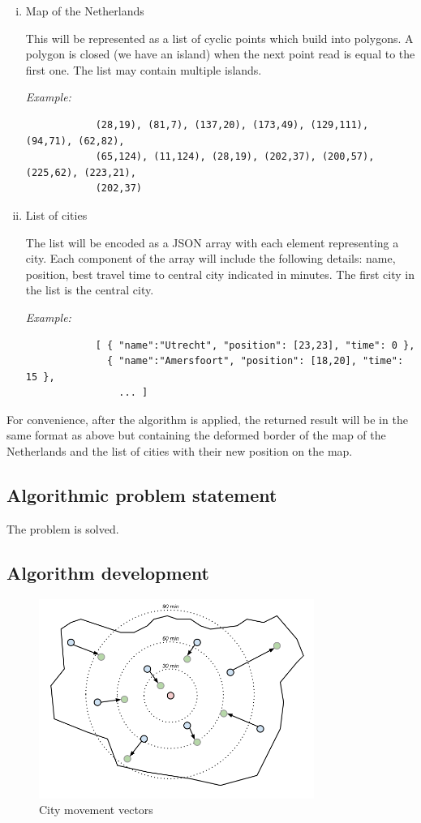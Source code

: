 \documentclass[a4paper,11pt]{article}
\begin{document}
\begin{enumerate}[(i)]
	\item Map of the Netherlands
	
		This will be represented as a list of cyclic points which build into polygons. A polygon is closed (we have an island) when the next point read is equal to the first one. The list may contain multiple islands.
		
		\emph{Example:} 
		\begin{verbatim}
			(28,19), (81,7), (137,20), (173,49), (129,111), (94,71), (62,82),
			(65,124), (11,124), (28,19), (202,37), (200,57), (225,62), (223,21),
			(202,37)
		\end{verbatim}

	\item List of cities
	
		The list will be encoded as a JSON array with each element representing a city. Each component of the array will include the following details: name, position, best travel time to central city indicated in minutes. The first city in the list is the central city.
		
		\emph{Example:}
		\begin{verbatim}
			[ { "name":"Utrecht", "position": [23,23], "time": 0 },
			  { "name":"Amersfoort", "position": [18,20], "time": 15 },
				... ]
		\end{verbatim}
\end{enumerate}

For convenience, after the algorithm is applied, the returned result will be in the same format as above but containing the deformed border of the map of the Netherlands and the list of cities with their new position on the map.

\subsection{Algorithmic problem statement}

The problem is solved.

\subsection{Algorithm development}

\begin{figure}[h!]
  \centering
  \includegraphics[width=0.8\textwidth]{forces.png}
  \caption{City movement vectors}
  \label{forces}
\end{figure}
\end{document}

